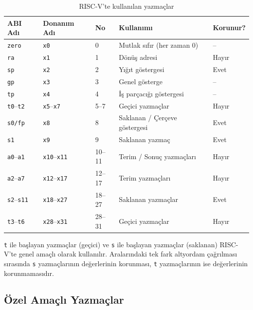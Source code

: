\begin{table}[H]
\centering
\caption{RISC-V'te kullanılan yazmaçlar}
\label{tab:riscv-yazmaclar}
\small
\begin{tabular}{lllp{5.5cm}l}
\toprule
\textbf{ABI Adı} & \textbf{Donanım Adı} & \textbf{No} & \textbf{Kullanımı} & \textbf{Korunur?} \\
\midrule
\texttt{zero}      & \texttt{x0}      & 0     & Mutlak sıfır (her zaman 0)       & -- \\
\texttt{ra}        & \texttt{x1}      & 1     & Dönüş adresi                     & Hayır \\
\texttt{sp}        & \texttt{x2}      & 2     & Yığıt göstergesi                 & Evet \\
\texttt{gp}        & \texttt{x3}      & 3     & Genel gösterge                   & -- \\
\texttt{tp}        & \texttt{x4}      & 4     & İş parçacığı göstergesi          & -- \\
\texttt{t0}--\texttt{t2} & \texttt{x5}--\texttt{x7} & 5--7  & Geçici yazmaçlar          & Hayır \\
\texttt{s0/fp}     & \texttt{x8}      & 8     & Saklanan / Çerçeve göstergesi    & Evet \\
\texttt{s1}        & \texttt{x9}      & 9     & Saklanan yazmaç                  & Evet \\
\texttt{a0}--\texttt{a1} & \texttt{x10}--\texttt{x11} & 10--11 & Terim / Sonuç yazmaçları & Hayır \\
\texttt{a2}--\texttt{a7} & \texttt{x12}--\texttt{x17} & 12--17 & Terim yazmaçları         & Hayır \\
\texttt{s2}--\texttt{s11} & \texttt{x18}--\texttt{x27} & 18--27 & Saklanan yazmaçlar      & Evet \\
\texttt{t3}--\texttt{t6} & \texttt{x28}--\texttt{x31} & 28--31 & Geçici yazmaçlar        & Hayır \\
\bottomrule
\end{tabular}
\end{table}

\texttt{t} ile başlayan yazmaçlar (geçici) ve \texttt{s} ile başlayan yazmaçlar (saklanan) RISC-V'te genel amaçlı olarak kullanılır. Aralarındaki tek fark altyordam çağrılması sırasında \texttt{s} yazmaçlarının değerlerinin korunması, \texttt{t} yazmaçlarının ise değerlerinin korunmamasıdır.

\subsection{Özel Amaçlı Yazmaçlar}
\label{subsec:ozel-amacli-yazmaclar}

